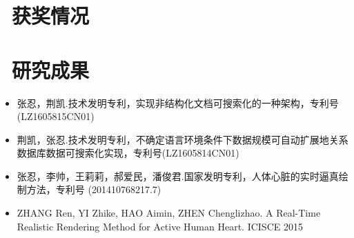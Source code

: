 \documentclass{resume}
\begin{document}
\section{\faHeartO\ 获奖情况}

\section{\faInfo\ 研究成果}
\begin{itemize}[parsep=0.5ex]
  \item 张忍，荆凯.技术发明专利，实现非结构化文档可搜索化的一种架构，专利号(LZ1605815CN01)
  \item 荆凯，张忍.技术发明专利，不确定语言环境条件下数据规模可自动扩展地关系数据库数据可搜索化实现，专利号(LZ1605814CN01)
  \item 张忍，李帅，王莉莉，郝爱民，潘俊君.国家发明专利，人体心脏的实时逼真绘制方法，专利号 (201410768217.7)
  \item ZHANG Ren, YI Zhike, HAO Aimin, ZHEN Chenglizhao. A Real-Time Realistic Rendering Method for Active Human Heart. ICISCE 2015
\end{itemize}

%
%
\end{document}
